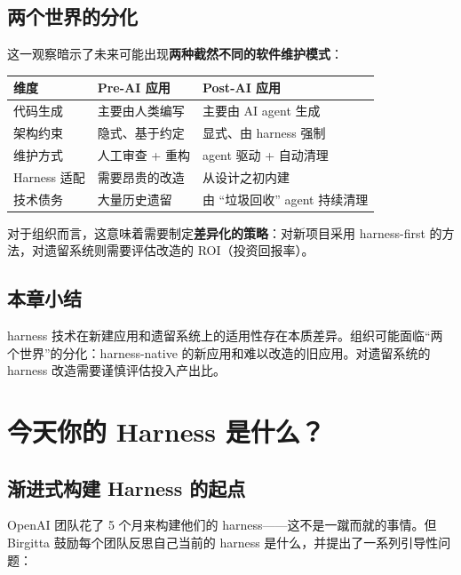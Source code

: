 \documentclass[a4paper]{article}
\begin{document}
\subsection{两个世界的分化}

这一观察暗示了未来可能出现\textbf{两种截然不同的软件维护模式}：

\begin{table}[H]
\centering
\begin{tabular}{lll}
\toprule
\textbf{维度} & \textbf{Pre-AI 应用} & \textbf{Post-AI 应用} \\
\midrule
代码生成 & 主要由人类编写 & 主要由 AI agent 生成 \\
架构约束 & 隐式、基于约定 & 显式、由 harness 强制 \\
维护方式 & 人工审查 + 重构 & agent 驱动 + 自动清理 \\
Harness 适配 & 需要昂贵的改造 & 从设计之初内建 \\
技术债务 & 大量历史遗留 & 由 ``垃圾回收'' agent 持续清理 \\
\bottomrule
\end{tabular}
\end{table}

对于组织而言，这意味着需要制定\textbf{差异化的策略}：对新项目采用 harness-first 的方法，对遗留系统则需要评估改造的 ROI（投资回报率）。

\subsection{本章小结}

harness 技术在新建应用和遗留系统上的适用性存在本质差异。组织可能面临``两个世界''的分化：harness-native 的新应用和难以改造的旧应用。对遗留系统的 harness 改造需要谨慎评估投入产出比。

\newpage

\section{今天你的 Harness 是什么？}

\subsection{渐进式构建 Harness 的起点}

OpenAI 团队花了 5 个月来构建他们的 harness------这不是一蹴而就的事情。但 Birgitta 鼓励每个团队反思自己当前的 harness 是什么，并提出了一系列引导性问题：
\end{document}
